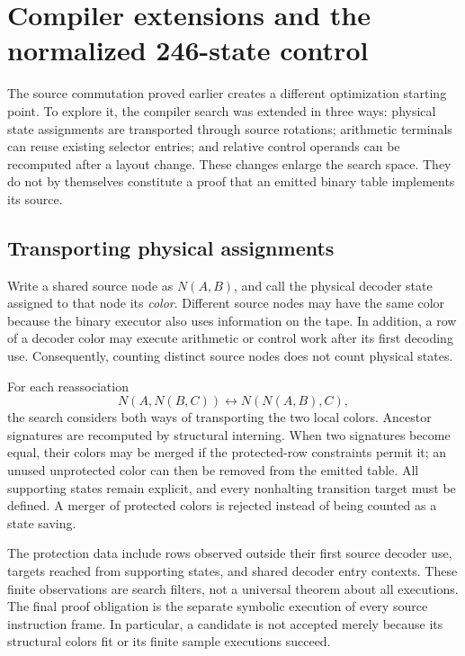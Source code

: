 \section{Compiler extensions and the normalized 246-state control}
\label{sec:compiler-extensions}

The source commutation proved earlier creates a different optimization
starting point.  To explore it, the compiler search was extended in three
ways: physical state assignments are transported through source rotations;
arithmetic terminals can reuse existing selector entries; and relative
control operands can be recomputed after a layout change.  These changes
enlarge the search space.  They do not by themselves constitute a proof
that an emitted binary table implements its source.

\subsection{Transporting physical assignments}

Write a shared source node as $N(A,B)$, and call the physical decoder state
assigned to that node its \emph{color}.  Different source nodes may have the
same color because the binary executor also uses information on the tape.
In addition, a row of a decoder color may execute arithmetic or control
work after its first decoding use.  Consequently, counting distinct source
nodes does not count physical states.

For each reassociation
\[
 N(A,N(B,C))\longleftrightarrow N(N(A,B),C),
\]
the search considers both ways of transporting the two local colors.
Ancestor signatures are recomputed by structural interning.  When two
signatures become equal, their colors may be merged if the protected-row
constraints permit it; an unused unprotected color can then be removed
from the emitted table.  All supporting states remain explicit, and every
nonhalting transition target must be defined.  A merger of protected
colors is rejected instead of being counted as a state saving.

The protection data include rows observed outside their first source
decoder use, targets reached from supporting states, and shared decoder
entry contexts.  These finite observations are search filters, not a
universal theorem about all executions.  The final proof obligation is
the separate symbolic execution of every source instruction frame.  In
particular, a candidate is not accepted merely because its structural
colors fit or its finite sample executions succeed.

